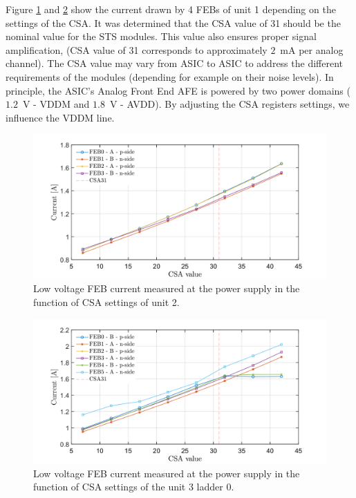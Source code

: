 \newpage
Figure \ref{fig_power3} and \ref{fig_power4} show the current drawn by 4 \glspl{FEB} of unit 1 depending on the settings of the \gls{CSA}. It was determined that the \gls{CSA} value of 31 should be the nominal value for the \gls{STS} modules. This value also ensures proper signal amplification, (\gls{CSA} value of 31 corresponds to approximately $2$~mA per analog channel). The \gls{CSA} value may vary from \gls{ASIC} to \gls{ASIC} to address the different requirements of the modules (depending for example on their noise levels). In principle, the \gls{ASIC}'s Analog Front End \gls{AFE} is powered by two power domains ($1.2$~V - VDDM and $1.8$~V - AVDD). By adjusting the \gls{CSA} registers settings, we influence the VDDM line. 
\begin{figure}[h!]
\centering
\includegraphics[width=0.9\columnwidth]{Chapter6/DCS/images/U0CSABIAS.png}
\caption{Low voltage \gls{FEB} current measured at the power supply in the function of CSA settings of unit 2. }
\label{fig_power3}
\end{figure}
\begin{figure}[h!]
\centering
\includegraphics[width=0.9\columnwidth]{Chapter6/DCS/images/U3L0CSABIAS.png}
\caption{Low voltage \gls{FEB} current measured at the power supply in the function of CSA settings of the unit 3 ladder 0.}
\label{fig_power4}
\end{figure}

